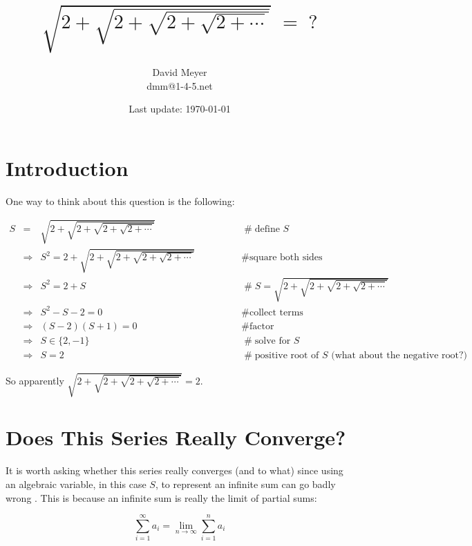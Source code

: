 \documentclass{article}
\title{$\sqrt{2 + \sqrt{2 + \sqrt{2 + \sqrt{2 + \cdots}}}}  \; = \; ?$}
\author{David Meyer \\ dmm@1-4-5.net}
\date{Last update: \today}
\theoremstyle{definition}
\begin{document}
\maketitle

\section{Introduction}
One way to think about this question is the following: 

\begin{equation*}
\begin{array}{llll}
S
&=&  \sqrt{2 + \sqrt{2 + \sqrt{2 + \sqrt{2 + \cdots}}}} 
				&\qquad \qquad \mathrel{\#} \text{define $S$} \\
[5pt]
&\Rightarrow& S^2 = 2 + \sqrt{2 + \sqrt{2 + \sqrt{2 + \sqrt{2 + \cdots}}}} 
				&\qquad \qquad \mathrel{\#} \text{square both sides} \\
[2pt]
&\Rightarrow& S^2 = 2 + S 
				&\qquad \qquad \mathrel{\#} S = \sqrt{2 + \sqrt{2 + \sqrt{2 + \sqrt{2 + \cdots}}}}  \\
[7pt]
&\Rightarrow& S^2 -S - 2 = 0 
				&\qquad \qquad \mathrel{\#} \text{collect terms} \\
[5pt]
&\Rightarrow& (S - 2)(S + 1) = 0
				&\qquad \qquad \mathrel{\#} \text{factor} \\
[5pt]
&\Rightarrow& S \in \{2,-1\}
				&\qquad \qquad \mathrel{\#} \text{solve for $S$} \\
[5pt]
&\Rightarrow& S = 2
				&\qquad \qquad \mathrel{\#} \text{positive root of $S$ (what about the negative root?)} 

\end{array}
\end{equation*}

\smallskip
\noindent
So apparently $ \sqrt{2 + \sqrt{2 + \sqrt{2 + \sqrt{2 + \cdots}}}}  = 2$.


\section{Does This Series Really Converge?}
It is worth asking whether this series really converges (and to what)
since using an algebraic variable, in this case $S$, to represent an 
infinite sum can go badly wrong \cite{can_you_spot_the_error}. 
This is because an infinite sum is really the limit of partial
sums: 

\begin{equation*}
\sum\limits_{i=1}^{\infty }a_{i} = \lim _{n\to \infty }\sum _{i=1}^{n}a_{i}
\end{equation*}
\end{document}

